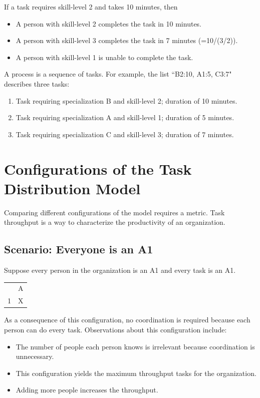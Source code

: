 If a task requires skill-level 2 and takes 10 minutes, then
\begin{itemize}
    \item A person with skill-level 2 completes the task in 10 minutes.
    \item A person with skill-level 3 completes the task in  7 minutes (=10/(3/2)).
    \item A person with skill-level 1 is unable to complete the task.
\end{itemize}


A process is a sequence of tasks. For example, the list ``B2:10, A1:5, C3:7" describes three tasks: 
\begin{enumerate}
    \item Task requiring specialization B and skill-level 2; duration of 10 minutes.
    \item Task requiring specialization A and skill-level 1; duration of 5 minutes.
    \item Task requiring specialization C and skill-level 3; duration of 7 minutes.    
\end{enumerate}

\section{Configurations of the Task Distribution Model}

Comparing different configurations of the model requires a metric. 
Task throughput is a way to characterize the productivity of an organization. 


\subsection*{Scenario: Everyone is an A1}

Suppose every person in the organization is an A1 and every task is an A1.

\begin{center}
\begin{tabular}{c|c|}
  & A \\
\cline{2-2}
1 & X \\
\cline{2-2}
\end{tabular}
\end{center}

As a consequence of this configuration, no coordination is required because each person can do every task. Observations about this configuration include:
\begin{itemize}
    \item The number of people each person knows is irrelevant because coordination is unnecessary.
    \item This configuration yields the maximum throughput tasks for the organization.
    \item Adding more people increases the throughput.
\end{itemize}

